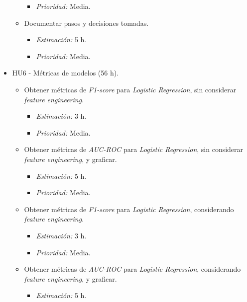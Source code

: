 \documentclass[
11pt, %
]{charter}
\begin{document}
\begin{itemize}
\begin{itemize}
\begin{itemize}
                    \item \textit{Prioridad:} Media.
                \end{itemize}  
            \item Documentar pasos y decisiones tomadas.
                \begin{itemize}
                    \item \textit{Estimación:} 5 h.
                    \item \textit{Prioridad:} Media.
                \end{itemize}
        \end{itemize}
    \item HU6 - Métricas de modelos (56 h).
        \begin{itemize}
            \item Obtener métricas de \textit{F1-score} para \textit{Logistic Regression}, sin  considerar \textit{feature engineering}.
                \begin{itemize}
                    \item \textit{Estimación:} 3 h.
                    \item \textit{Prioridad:} Media.
                \end{itemize}
            \item Obtener métricas de \textit{AUC-ROC} para \textit{Logistic Regression}, sin  considerar \textit{feature engineering}, y graficar.
                \begin{itemize}
                    \item \textit{Estimación:} 5 h.
                    \item \textit{Prioridad:} Media.
                \end{itemize}
            \item Obtener métricas de \textit{F1-score} para \textit{Logistic Regression}, considerando \textit{feature engineering}.
                \begin{itemize}
                    \item \textit{Estimación:} 3 h.
                    \item \textit{Prioridad:} Media.
                \end{itemize}
            \item Obtener métricas de \textit{AUC-ROC} para \textit{Logistic Regression}, considerando \textit{feature engineering}, y graficar.
                \begin{itemize}
                    \item \textit{Estimación:} 5 h.

\end{itemize}
\end{itemize}
\end{itemize}
\end{document}
